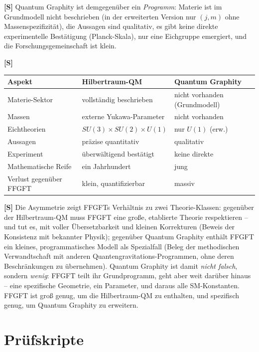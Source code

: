 \textbf{[S]} Quantum Graphity ist demgegenüber ein \emph{Programm}: Materie ist im
Grundmodell nicht beschrieben (in der erweiterten Version nur $(j,m)$ ohne
Massenspezifizität), die Aussagen sind qualitativ, es gibt keine direkte
experimentelle Bestätigung (Planck-Skala), nur eine Eichgruppe emergiert, und die
Forschungsgemeinschaft ist klein.

\textbf{[S]}
\begin{center}
\renewcommand{\arraystretch}{1.35}
{\small
\begin{tabular}{lll}
\toprule
\textbf{Aspekt} & \textbf{Hilbertraum-QM} & \textbf{Quantum Graphity} \\
\midrule
Materie-Sektor & vollständig beschrieben & nicht vorhanden (Grundmodell) \\
Massen & externe Yukawa-Parameter & nicht vorhanden \\
Eichtheorien & $SU(3)\!\times\!SU(2)\!\times\!U(1)$ & nur $U(1)$ (erw.) \\
Aussagen & präzise quantitativ & qualitativ \\
Experiment & überwältigend bestätigt & keine direkte \\
Mathematische Reife & ein Jahrhundert & jung \\
Verlust gegenüber FFGFT & klein, quantifizierbar & massiv \\
\bottomrule
\end{tabular}
}
\renewcommand{\arraystretch}{1.0}
\end{center}

\textbf{[S]} Die Asymmetrie zeigt FFGFTs Verhältnis zu zwei Theorie-Klassen:
gegenüber der Hilbertraum-QM muss FFGFT eine große, etablierte Theorie respektieren
-- und tut es, mit voller Übersetzbarkeit und kleinen Korrekturen (Beweis der
Konsistenz mit bekannter Physik); gegenüber Quantum Graphity enthält FFGFT ein
kleines, programmatisches Modell als Spezialfall (Beleg der methodischen
Verwandtschaft mit anderen Quantengravitations-Programmen, ohne deren
Beschränkungen zu übernehmen). Quantum Graphity ist damit \emph{nicht falsch},
sondern \emph{wenig}: FFGFT teilt ihr Grundprogramm, geht aber weit darüber hinaus
-- eine spezifische Geometrie, ein Parameter, und daraus alle SM-Konstanten. FFGFT
ist groß genug, um die Hilbertraum-QM zu enthalten, und spezifisch genug, um
Quantum Graphity zu erweitern.

\section{Prüfskripte}

